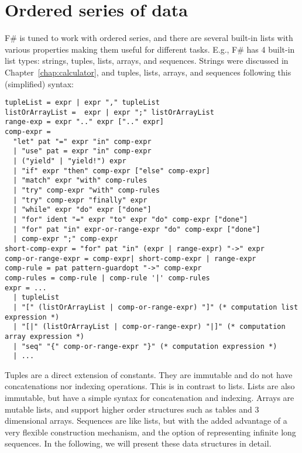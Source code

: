 \chapter{Ordered series of data}
\label{chap:lists}
F\# is tuned to work with ordered series, and there are several built-in lists with various properties making them useful for different tasks. E.g.,
%
%
F\# has 4 built-in list types: strings, tuples, lists, arrays, and sequences. Strings were discussed in Chapter~\ref{chap:calculator}, and tuples, lists, arrays, and sequences following this (simplified) syntax:
%
\begin{lstlisting}[language=ebnf]
tupleList = expr | expr "," tupleList
listOrArrayList =  expr | expr ";" listOrArrayList
range-exp = expr ".." expr [".." expr]
comp-expr =
  "let" pat "=" expr "in" comp-expr
  | "use" pat = expr "in" comp-expr
  | ("yield" | "yield!") expr
  | "if" expr "then" comp-expr ["else" comp-expr]
  | "match" expr "with" comp-rules
  | "try" comp-expr "with" comp-rules
  | "try" comp-expr "finally" expr
  | "while" expr "do" expr ["done"]
  | "for" ident "=" expr "to" expr "do" comp-expr ["done"]
  | "for" pat "in" expr-or-range-expr "do" comp-expr ["done"]
  | comp-expr ";" comp-expr
short-comp-expr = "for" pat "in" (expr | range-expr) "->" expr
comp-or-range-expr = comp-expr| short-comp-expr | range-expr
comp-rule = pat pattern-guardopt "->" comp-expr
comp-rules = comp-rule | comp-rule '|' comp-rules
expr = ... 
  | tupleList
  | "[" (listOrArrayList | comp-or-range-expr) "]" (* computation list expression *)
  | "[|" (listOrArrayList | comp-or-range-expr) "|]" (* computation array expression *)
  | "seq" "{" comp-or-range-expr "}" (* computation expression *)
  | ...
\end{lstlisting}
%
Tuples are a direct extension of constants. They are immutable and do not have concatenations nor indexing operations. This is in contrast to lists. Lists are also immutable, but have a simple syntax for concatenation and indexing. Arrays are mutable lists, and support higher order structures such as tables and 3 dimensional arrays. Sequences are like lists, but with the added advantage of a very flexible construction mechanism, and the option of representing infinite long sequences. In the following, we will present these data structures in detail.

